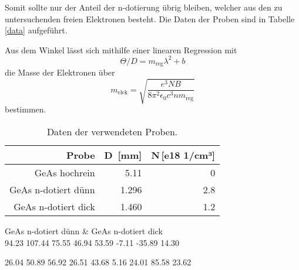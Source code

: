 Somit sollte nur der Anteil der n-dotierung übrig bleiben, welcher aus den zu untersuchenden freien Elektronen besteht.
Die Daten der Proben sind in Tabelle \ref{data} aufgeführt.

Aus dem Winkel lässt sich mithilfe einer linearen Regression mit
\begin{equation}
	\Theta / D = m_\text{reg} \lambda^2 + b
\end{equation}
die Masse der Elektronen über
\begin{equation}
	m_\text{elek} = \sqrt{\frac{e^3 N B}{8 \pi^2 \epsilon_0 c^3 n m_\text{reg}}}
\end{equation}
bestimmen.




\begin{table}
	\centering
	\caption{Daten der verwendeten Proben.}
	\begin{tabular}{r r r}
		Probe & D \,[mm]& N\,[e18 1/cm³]\\ 
		\hline	\hline
		GeAs hochrein & 5.11 & 0\\
		GeAs n-dotiert dünn & 1.296 & 2.8\\
		GeAs n-dotiert dick & 1.460 & 1.2\\
	\end{tabular}
\end{table}


\begin{table}
	\centering
	\caption{Drehwinkel der n-dotierten Proben, nachdem der Winkel der hochreinen Probe abgezogen wurde.}
	\begin{tabular}
		GeAs n-dotiert dünn & GeAs n-dotiert dick\\
		\hline \hline
		102.42   
		 94.23
		107.44
		 75.55
		 46.94
		 53.59
		 -7.11
		-35.89
		 14.30

	\end{tabular}
\end{table}

 26.04
 50.89
 56.92
 26.51
 43.68
  5.16
 24.01
 85.58
 23.62

